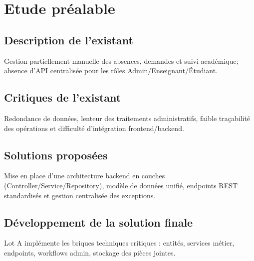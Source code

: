 \chapter{Etude préalable}

\section{Description de l'existant}
Gestion partiellement manuelle des absences, demandes et suivi académique; absence d'API centralisée pour les rôles Admin/Enseignant/Étudiant.

\section{Critiques de l'existant}
Redondance de données, lenteur des traitements administratifs, faible traçabilité des opérations et difficulté d'intégration frontend/backend.

\section{Solutions proposées}
Mise en place d'une architecture backend en couches (Controller/Service/Repository), modèle de données unifié, endpoints REST standardisés et gestion centralisée des exceptions.

\section{Développement de la solution finale}
Lot A implémente les briques techniques critiques : entités, services métier, endpoints, workflows admin, stockage des pièces jointes.
